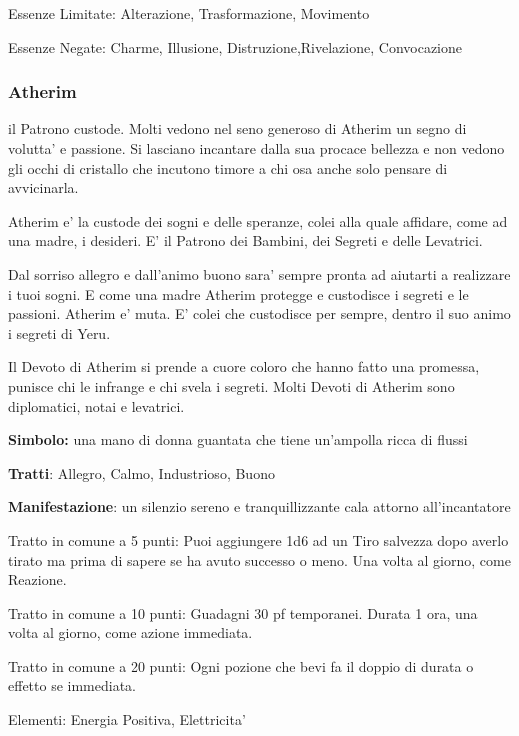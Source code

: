 \documentclass[a4paper,11pt,twoside,openany]{dndbook}
\begin{document}
{Essenze Limitate: Alterazione, Trasformazione, Movimento

Essenze Negate: Charme, Illusione, Distruzione,Rivelazione, Convocazione

\subsubsection{Atherim}

\label{atherim}

il Patrono custode. Molti vedono nel seno generoso di Atherim un segno di volutta' e passione. Si lasciano incantare dalla sua procace bellezza e non vedono gli occhi di cristallo che incutono timore a chi osa anche solo pensare di avvicinarla.

Atherim e' la custode dei sogni e delle speranze, colei alla quale affidare, come ad una madre, i desideri. E' il Patrono dei Bambini, dei Segreti e delle Levatrici.

Dal sorriso allegro e dall'animo buono sara' sempre pronta ad aiutarti a realizzare i tuoi sogni. E come una madre Atherim protegge e custodisce i segreti e le passioni. Atherim e' muta. E' colei che custodisce per sempre, dentro il suo animo i segreti di Yeru.

Il Devoto di Atherim si prende a cuore coloro che hanno fatto una promessa, punisce chi le infrange e chi svela i segreti. Molti Devoti di Atherim sono diplomatici, notai e levatrici.

\textbf{Simbolo:} una mano di donna guantata che tiene un'ampolla ricca di flussi

\textbf{Tratti}: Allegro, Calmo, Industrioso, Buono

\textbf{Manifestazione}: un silenzio sereno e tranquillizzante cala attorno all'incantatore

\bigskip

Tratto in comune a 5 punti: Puoi aggiungere 1d6 ad un Tiro salvezza dopo averlo tirato ma prima di sapere se ha avuto successo o meno. Una volta al giorno, come Reazione.

Tratto in comune a 10 punti: Guadagni 30 pf temporanei. Durata 1 ora, una volta al giorno, come azione immediata.

Tratto in comune a 20 punti: Ogni pozione che bevi fa il doppio di durata o effetto se immediata.

\bigskip

Elementi: Energia Positiva, Elettricita'

\bigskip

}
\end{document}
